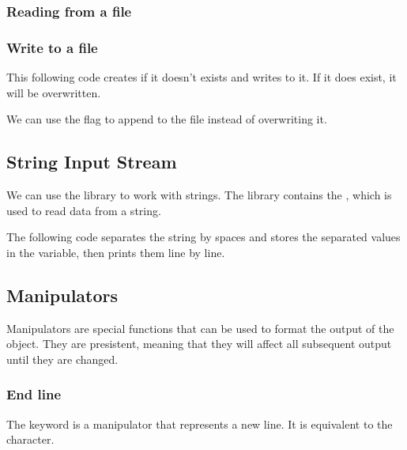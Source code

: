 \documentclass{article}
\begin{document}
\subsubsection{Reading from a file}


\subsubsection{Write to a file}
This following code creates  if it doesn't exists and writes to it. If it does exist, it will be overwritten.


We can use the  flag to append to the file instead of overwriting it.


\subsection{String Input Stream}
We can use the  library to work with strings. The  library contains the , which is used to read data from a string.

The following code separates the string  by spaces and stores the separated values in the  variable, then prints them line by line.



\subsection{Manipulators}
Manipulators are special functions that can be used to format the output of the  object. They are presistent, meaning that they will affect all subsequent output until they are changed.

\subsubsection{End line}
The keyword  is a manipulator that represents a new line. It is equivalent to the  character.
\end{document}
